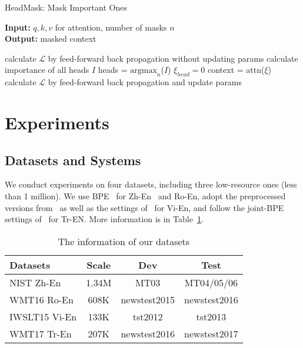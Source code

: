 \documentclass[11pt]{article}
\begin{document}
\begin{algorithm}[h]\footnotesize
    \caption{HeadMask: Mask Important Ones}
    \label{alg_importance}
    \begin{flushleft}
        \hspace*{0.02in} {\bf Input:} $q, k, v$ for attention, number of masks $n$\\
        \hspace*{0.02in} {\bf Output:} masked context
    \end{flushleft}
    \begin{algorithmic}[1]
            \STATE calculate $\mathcal{L}$ by feed-forward
            \STATE back propagation without updating params
            \STATE calculate importance of all heads $I$
            \STATE heads = $\text{argmax}_n$($I$)
                \STATE $\xi_{head} = 0$
            \ENDFOR
            \STATE context = attn($\xi$)
            \STATE calculate $\mathcal{L}$ by feed-forward
            \STATE back propagation and update params
        \ENDFOR
  \end{algorithmic}
\end{algorithm}



\section{Experiments}

\subsection{Datasets and Systems}

We conduct experiments on four datasets, including three low-resource ones (less than 1 million). We use BPE~\cite{sennrich2016bpe} for Zh-En~\cite{Zheng2018LearningTD} and Ro-En, adopt the preprocessed versions from~ as well as the settings of~ for Vi-En, and follow the joint-BPE settings of~ for Tr-EN.
More information is in Table~\ref{tab_dataset}.





\begin{table}[h]\footnotesize
    \centering
    \begin{tabular}{lccc}
        \hline
        Datasets & Scale & Dev & Test \\ \hline
        NIST Zh-En & 1.34M & MT03 & MT04/05/06 \\ \hline
        WMT16 Ro-En & 608K & newstest2015 & newstest2016  \\ \hline
        IWSLT15 Vi-En & 133K & tst2012 & tst2013 \\ \hline
        WMT17 Tr-En & 207K & newstest2016 & newstest2017 \\ \hline
    \end{tabular}
    \caption{The information of our datasets}
    \label{tab_dataset}
\end{table}
\end{document}
